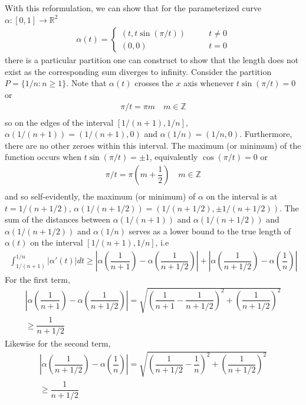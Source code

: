 \documentclass{article}
\newcommand{\R}{\mathbb{R}}
\begin{document}
	With this reformulation, we can show that for the parameterized curve $\alpha: [0, 1] \to \R^2$
	\begin{align*}
		\alpha(t) = \begin{cases}
			(t, t \sin (\pi/t)) \qquad &t \neq 0 \\
			(0, 0) \qquad &t = 0
		\end{cases}
	\end{align*}
	there is a particular partition one can construct to show that the length does not exist as the corresponding sum diverges to infinity. Consider the partition $P = \{1/n : n \geq 1\}$. Note that $\alpha(t)$ crosses the $x$ axis whenever $t \sin(\pi/t) = 0$ or
	\begin{gather*}
		\pi/t = \pi m \quad m \in \mathbb{Z} \\ 
	\end{gather*}
	so on the edges of the interval $[1/(n + 1), 1/n]$, $\alpha(1/(n + 1)) = (1/(n + 1), 0)$ and $\alpha(1/n) = (1/n, 0)$. Furthermore, there are no other zeroes within this interval. The maximum (or minimum) of the function occurs when $t \sin(\pi/t) = \pm 1$, equivalently $\cos(\pi/t) = 0$ or
	\begin{gather*}
		\pi/t = \pi \left( m + \dfrac{1}{2} \right) \quad m \in \mathbb{Z} \\ 
	\end{gather*}
	and so self-evidently, the maximum (or minimum) of $\alpha$ on the interval is at $t = 1/(n + 1/2)$, $\alpha(1/(n + 1/2)) = (1/(n + 1/2), \pm 1/(n + 1/2))$. The sum of the distances between $\alpha(1/(n + 1))$ and $\alpha(1/(n + 1/2))$ and $\alpha(1/(n + 1/2))$ and $\alpha(1/n)$ serves as a lower bound to the true length of $\alpha(t)$ on the interval $[1/(n + 1), 1/n]$, i.e
	\begin{gather*}
		\int_{1/(n + 1)}^{1/n} |\alpha'(t)| dt \geq \left| \alpha \left( \dfrac{1}{n + 1} \right) - \alpha \left( \dfrac{1}{n + 1/2} \right) \right| + \left| \alpha \left( \dfrac{1}{n + 1/2} \right) - \alpha \left( \dfrac{1}{n} \right) \right|
	\end{gather*}
	For the first term,
	\begin{gather*}
		\left| \alpha \left( \dfrac{1}{n + 1} \right) - \alpha \left( \dfrac{1}{n + 1/2} \right) \right| = \sqrt{ \left( \dfrac{1}{n + 1} - \dfrac{1}{n + 1/2} \right)^2 + \left( \dfrac{1}{n + 1/2} \right)^2 } \\
		\geq \dfrac{1}{n + 1/2}
	\end{gather*}
	Likewise for the second term,
		\begin{gather*}
		\left| \alpha \left( \dfrac{1}{n + 1/2} \right) - \alpha \left( \dfrac{1}{n} \right) \right| = \sqrt{ \left( \dfrac{1}{n + 1/2} - \dfrac{1}{n} \right)^2 + \left( \dfrac{1}{n + 1/2} \right)^2 } \\
		\geq \dfrac{1}{n + 1/2}
	\end{gather*}
\end{document}
